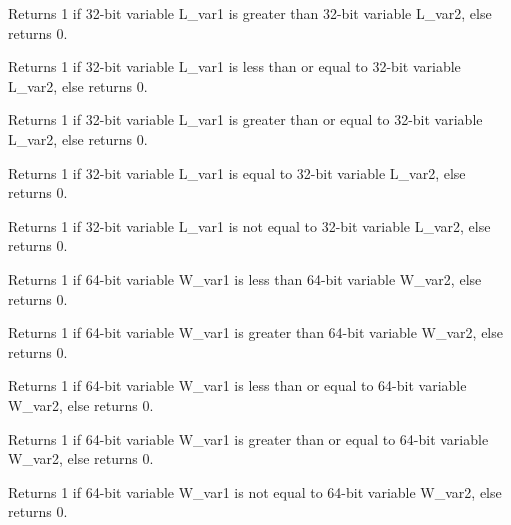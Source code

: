 Returns 1 if 32-bit variable L\_var1 is greater than 32-bit variable L\_var2, else returns 0.


Returns 1 if 32-bit variable L\_var1 is less than or equal to 32-bit variable L\_var2, else returns 0.


Returns 1 if 32-bit variable L\_var1 is greater than or equal to 32-bit variable L\_var2, else returns 0.


Returns 1 if 32-bit variable L\_var1 is equal to 32-bit variable L\_var2, else returns 0.


Returns 1 if 32-bit variable L\_var1 is not equal to 32-bit variable L\_var2, else returns 0.


Returns 1 if 64-bit variable W\_var1 is less than 64-bit variable W\_var2, else returns 0.


Returns 1 if 64-bit variable W\_var1 is greater than 64-bit variable W\_var2, else returns 0.


Returns 1 if 64-bit variable W\_var1 is less than or equal to 64-bit variable W\_var2, else returns 0.


Returns 1 if 64-bit variable W\_var1 is greater than or equal to 64-bit variable W\_var2, else returns 0.


Returns 1 if 64-bit variable W\_var1 is not equal to 64-bit variable W\_var2, else returns 0.

